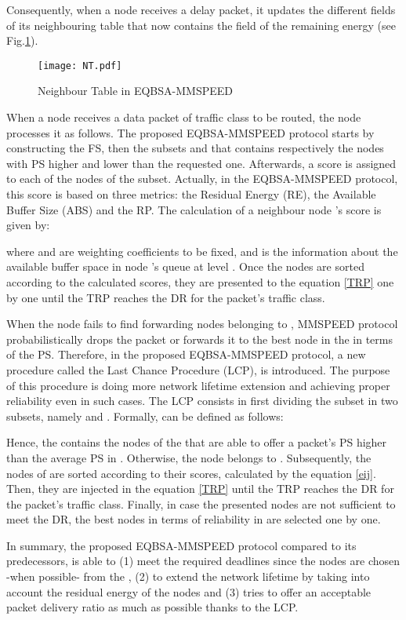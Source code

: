 \documentclass[conference,a4paper]{IEEEtran}
\begin{document}
Consequently, when  a node receives a delay packet, it updates the different fields of its neighbouring table that now contains the field of the remaining energy (see Fig.\ref{NT}).
\begin{figure}[htb]
\centering \texttt{[image: NT.pdf]}
\caption{Neighbour Table in EQBSA-MMSPEED}
\label{NT}
\end{figure}

When a node receives a data packet of traffic class  to be routed, the node processes it as follows. The proposed EQBSA-MMSPEED protocol starts by constructing the FS, then the subsets  and  that contains respectively the nodes with PS higher and lower than the requested one. Afterwards, a score is assigned to each of the nodes of the  subset. Actually, in the EQBSA-MMSPEED protocol, this score is based on three metrics: the Residual Energy (RE), the Available Buffer Size (ABS) and the RP. The calculation of a neighbour node 's score is given by: 

where  and  are weighting coefficients to be fixed, and  is the information about the available buffer space in node 's queue at level . Once the nodes are sorted according to the calculated scores, they are presented to the equation \ref{TRP} one by one until the TRP reaches the DR for the packet's traffic class. 

When the node fails to find forwarding nodes belonging to , MMSPEED protocol probabilistically drops the packet or forwards it to the best node in the  in terms of the PS. Therefore, in the proposed EQBSA-MMSPEED protocol, a new procedure called the Last Chance Procedure (LCP), is introduced. The purpose of this procedure is doing more network lifetime extension and achieving proper reliability even in such cases.
The LCP consists in first dividing the subset   in two subsets, namely  and . Formally,  can be defined as follows:
 
Hence, the  contains the nodes of the  that are able to offer a packet's PS higher than the average PS in . Otherwise, the node belongs to . Subsequently, the nodes of  are sorted according to their scores, calculated by the equation \ref{eij}. Then, they are injected in the equation \ref{TRP} until the TRP reaches the DR for the packet's traffic class. 
Finally, in case the presented nodes are not sufficient to meet the DR, the best nodes in terms of reliability in  are selected one by one.

In summary, the proposed EQBSA-MMSPEED protocol compared to its predecessors, is able to (1) meet the required deadlines since the nodes are chosen -when possible- from the , (2) to extend the network lifetime by taking into account the residual energy of the nodes and (3) tries to offer an acceptable packet delivery ratio as much as possible thanks to the LCP.  
\end{document}
